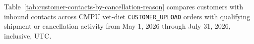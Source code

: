 Table~\ref{tab:customer-contacts-by-cancellation-reason} compares customers with
inbound contacts across CMPU vet-diet \texttt{CUSTOMER\_UPLOAD} orders with
qualifying shipment or cancellation activity from May 1, 2026 through July 31, 2026, inclusive, UTC.



\clearpage
